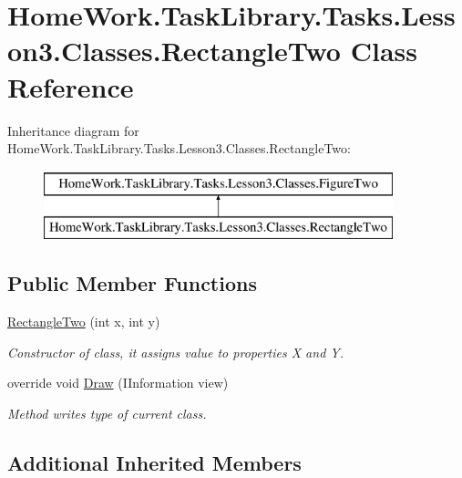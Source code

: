 \hypertarget{class_home_work_1_1_task_library_1_1_tasks_1_1_lesson3_1_1_classes_1_1_rectangle_two}{}\section{Home\+Work.\+Task\+Library.\+Tasks.\+Lesson3.\+Classes.\+Rectangle\+Two Class Reference}
\label{class_home_work_1_1_task_library_1_1_tasks_1_1_lesson3_1_1_classes_1_1_rectangle_two}
Inheritance diagram for Home\+Work.\+Task\+Library.\+Tasks.\+Lesson3.\+Classes.\+Rectangle\+Two\+:\begin{figure}[H]
\begin{center}
\leavevmode
\includegraphics[height=2.000000cm]{class_home_work_1_1_task_library_1_1_tasks_1_1_lesson3_1_1_classes_1_1_rectangle_two}
\end{center}
\end{figure}
\subsection*{Public Member Functions}
\begin{DoxyCompactItemize}
\item 
\mbox{\hyperlink{class_home_work_1_1_task_library_1_1_tasks_1_1_lesson3_1_1_classes_1_1_rectangle_two_ac739093c116155b37d374bf36d296a5b}{Rectangle\+Two}} (int x, int y)
\begin{DoxyCompactList}\small\item\em Constructor of class, it assigns value to properties X and Y. \end{DoxyCompactList}\item 
override void \mbox{\hyperlink{class_home_work_1_1_task_library_1_1_tasks_1_1_lesson3_1_1_classes_1_1_rectangle_two_ae3df70f68e23fa29ad3d98abedab6a0d}{Draw}} (I\+Information view)
\begin{DoxyCompactList}\small\item\em Method writes type of current class. \end{DoxyCompactList}\end{DoxyCompactItemize}
\subsection*{Additional Inherited Members}


